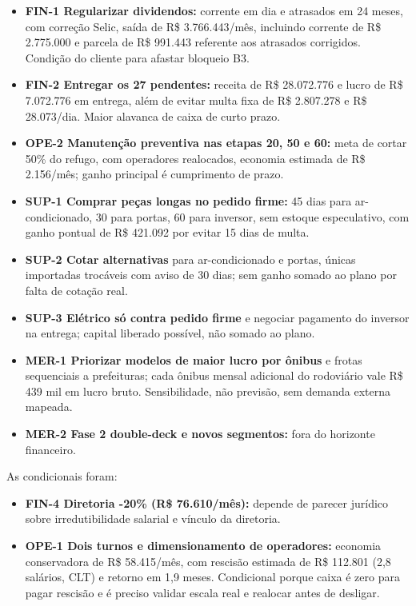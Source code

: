 \documentclass[12pt,a4paper,oneside,brazil]{abntex2}
\begin{document}
\begin{itemize}
\item \textbf{FIN-1 Regularizar dividendos:} corrente em dia e atrasados em 24 meses, com correção Selic, saída de R\$ 3.766.443/mês, incluindo corrente de R\$ 2.775.000 e parcela de R\$ 991.443 referente aos atrasados corrigidos. Condição do cliente para afastar bloqueio B3.
\item \textbf{FIN-2 Entregar os 27 pendentes:} receita de R\$ 28.072.776 e lucro de R\$ 7.072.776 em entrega, além de evitar multa fixa de R\$ 2.807.278 e R\$ 28.073/dia. Maior alavanca de caixa de curto prazo.
\item \textbf{OPE-2 Manutenção preventiva nas etapas 20, 50 e 60:} meta de cortar 50\% do refugo, com operadores realocados, economia estimada de R\$ 2.156/mês; ganho principal é cumprimento de prazo.
\item \textbf{SUP-1 Comprar peças longas no pedido firme:} 45 dias para ar-condicionado, 30 para portas, 60 para inversor, sem estoque especulativo, com ganho pontual de R\$ 421.092 por evitar 15 dias de multa.
\item \textbf{SUP-2 Cotar alternativas} para ar-condicionado e portas, únicas importadas trocáveis com aviso de 30 dias; sem ganho somado ao plano por falta de cotação real.
\item \textbf{SUP-3 Elétrico só contra pedido firme} e negociar pagamento do inversor na entrega; capital liberado possível, não somado ao plano.
\item \textbf{MER-1 Priorizar modelos de maior lucro por ônibus} e frotas sequenciais a prefeituras; cada ônibus mensal adicional do rodoviário vale R\$ 439 mil em lucro bruto. Sensibilidade, não previsão, sem demanda externa mapeada.
\item \textbf{MER-2 Fase 2 double-deck e novos segmentos:} fora do horizonte financeiro.
\end{itemize}

As condicionais foram:

\begin{itemize}
\item \textbf{FIN-4 Diretoria -20\% (R\$ 76.610/mês):} depende de parecer jurídico sobre irredutibilidade salarial e vínculo da diretoria.
\item \textbf{OPE-1 Dois turnos e dimensionamento de operadores:} economia conservadora de R\$ 58.415/mês, com rescisão estimada de R\$ 112.801 (2,8 salários, CLT) e retorno em 1,9 meses. Condicional porque caixa é zero para pagar rescisão e é preciso validar escala real e realocar antes de desligar.
\end{itemize}
\end{document}
